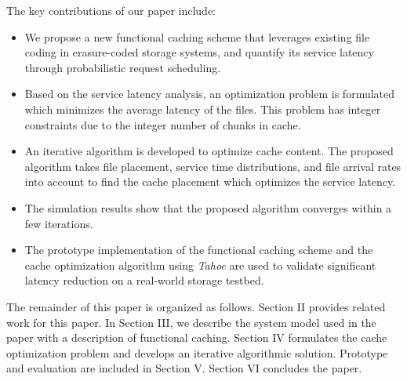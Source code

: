 

The key contributions of our paper include:
\begin{itemize}
\item We propose a new functional caching scheme that leverages existing file coding in erasure-coded storage systems, and quantify its service latency through probabilistic request scheduling.
\item Based on the service latency analysis, an optimization problem is formulated which minimizes the average latency of the files. This problem has integer constraints due to the integer number of chunks in cache.
\item An iterative algorithm is developed to optimize cache content. The proposed algorithm takes file placement, service time distributions, and file arrival rates into account to find the cache placement which optimizes the service latency.
\item The simulation results show that the proposed algorithm converges within a few iterations.
\item The prototype implementation of the functional caching scheme and the cache optimization algorithm using {\em Tahoe} are used to validate significant latency reduction on a real-world storage testbed.
\end{itemize}
The remainder of this paper is organized as follows. Section II provides related work for this paper. In Section III, we describe the system model used in the paper with a description of  functional caching. Section IV formulates the cache optimization problem and develops an iterative algorithmic solution. Prototype and evaluation are included in Section V. Section VI concludes the paper.

